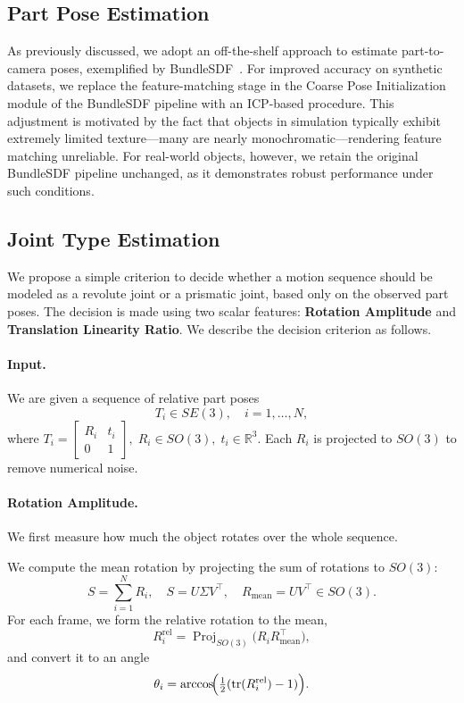 \subsection{Part Pose Estimation}
\label{sec:camera}
As previously discussed, we adopt an off-the-shelf approach to estimate part-to-camera poses, exemplified by BundleSDF~\cite{bundlesdf}. For improved accuracy on synthetic datasets, we replace the feature-matching stage in the Coarse Pose Initialization module of the BundleSDF pipeline with an ICP-based procedure. This adjustment is motivated by the fact that objects in simulation typically exhibit extremely limited texture—many are nearly monochromatic—rendering feature matching unreliable.
For real-world objects, however, we retain the original BundleSDF pipeline unchanged, as it demonstrates robust performance under such conditions.
\subsection{Joint Type Estimation}
\label{sec:jointtype}
We propose a simple criterion to decide whether a motion sequence
should be modeled as a revolute joint or a prismatic joint, based only on
the observed part poses. The decision is made using two scalar features: \textbf{Rotation Amplitude} and \textbf{Translation Linearity Ratio}. We describe the decision criterion as follows.

\paragraph{Input.}
We are given a sequence of relative part poses
\[
T_i \in SE(3), \quad i = 1,\dots,N,
\]
where
\(
T_i =
\begin{bmatrix}
R_i & t_i \\
0 & 1
\end{bmatrix},
\; R_i \in SO(3),\; t_i \in \mathbb{R}^3.
\)
Each $R_i$ is projected to $SO(3)$ to remove numerical noise.

\paragraph{Rotation Amplitude.}
We first measure how much the object rotates over the whole sequence.

We compute the mean rotation by projecting the sum of rotations to
$SO(3)$:
\[
S = \sum_{i=1}^N R_i, \quad
S = U \Sigma V^\top, \quad
R_{\mathrm{mean}} = U V^\top \in SO(3).
\]
For each frame, we form the relative rotation to the mean,
\[
R_i^{\mathrm{rel}} = \operatorname{Proj}_{SO(3)}\!\bigl(R_i R_{\mathrm{mean}}^\top\bigr),
\]
and convert it to an angle
\[
\theta_i = \arccos\!\Bigl(\tfrac{1}{2}(\operatorname{tr}(R_i^{\mathrm{rel}})-1)\Bigr).
\]

